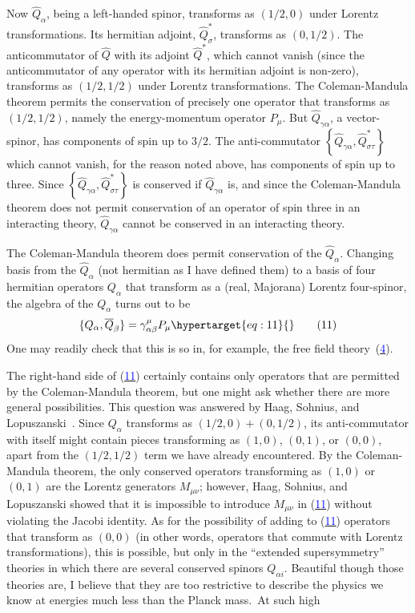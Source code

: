 \documentclass[11pt,a4paper]{article}
\newcommand{\eqtarget}[1]{\hypertarget{eq:#1}{\mathstrut}\tag{#1}}
\newcommand{\eqnref}[1]{(\hyperlink{eq:#1}{\textcolor{blue}{#1}})}
\begin{document}
Now $\hat Q_\alpha$, being a left-handed spinor, transforms as $(1/2,0)$
under Lorentz transformations. Its hermitian adjoint, $\hat Q^*_{\sigma}$, transforms
as $(0,1/2)$. The anticommutator of $\hat Q$ with its adjoint $\hat Q^*$, which cannot
vanish (since the anticommutator of any operator with its hermitian adjoint is non-zero), transforms as $(1/2,1/2)$ under Lorentz
transformations. The Coleman-Mandula theorem permits the conservation
of precisely one operator that transforms as $(1/2,1/2)$, namely
the energy-momentum operator $P_\mu$. But $\hat Q_{\gamma\alpha}$, a vector-spinor, has
components of spin up to $3/2$. The anti-commutator $\left\{\hat Q_{\gamma\alpha}, \hat Q^*_{\sigma\tau}\right\}$ which
cannot vanish, for the reason noted above, has components of spin up
to three. Since $\left\{\hat Q_{\gamma\alpha}, \hat Q^*_{\sigma\tau}\right\}$ is conserved if $\hat Q_{\gamma\alpha}$ is, and since the
Coleman-Mandula theorem does not permit conservation of an operator
of spin three in an interacting theory, $\hat Q_{\gamma\alpha}$ cannot be conserved in an
interacting theory.

The Coleman-Mandula theorem does permit conservation of the $\hat Q_\alpha$.
Changing basis from the $\hat Q_\alpha$ (not hermitian as I have defined them) to
a basis of four hermitian operators $Q_\alpha$ that transform as a (real,
Majorana) Lorentz four-spinor, the algebra of the $Q_\alpha$ turns out to be
\begin{equation}
\{Q_\alpha, \overline{Q}_\beta\} = \gamma^\mu_{\alpha\beta} P_\mu
\eqtarget{11}
\end{equation}
One may readily check that this is so in, for example, the free
field theory~\eqnref{4}.

The right-hand side of \eqnref{11} certainly contains only operators
that are permitted by the Coleman-Mandula theorem, but one might ask
whether there are more general possibilities. This question was
answered by Haag, Sohnius, and Lopuszanski~\cite{ref4}. Since $Q_\alpha$ transforms as
$(1/2,0) + (0,1/2)$, its anti-commutator with itself might contain
pieces transforming as $(1,0)$, $(0,1)$, or $(0,0)$, apart from the
$(1/2,1/2)$ term we have already encountered. By the Coleman-Mandula
theorem, the only conserved operators transforming as $(1,0)$ or $(0,1)$
are the Lorentz generators $M_{\mu\nu}$; however, Haag, Sohnius, and Lopuszanski
showed that it is impossible to introduce $M_{\mu\nu}$ in \eqnref{11} without
violating the Jacobi identity. As for the possibility of adding to
\eqnref{11} operators that transform as $(0,0)$ (in other words, operators
that commute with Lorentz transformations), this is possible, but
only in the ``extended supersymmetry'' theories in which there are
several conserved spinors $Q_{\alpha i}$. Beautiful though those theories are,
I believe that they are too restrictive to describe the physics we
know at energies much less than the Planck mass.\begingroup\renewcommand{\thefootnote}{\fnsymbol{footnote}}\footnotemark[1]\endgroup\ At such high
\end{document}
